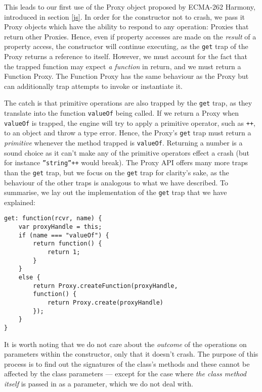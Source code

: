 This leads to our first use of the Proxy object proposed by ECMA-262 Harmony, introduced in section \ref{js}. In order for the constructor not to crash, we pass it Proxy objects which have the ability to respond to any operation: Proxies that return other Proxies. Hence, even if property accesses are made on the \emph{result} of a property access, the constructor will continue executing, as the \texttt{get} trap of the Proxy returns a reference to itself. However, we must account for the fact that the trapped function may expect \emph{a function} in return, and we must return a Function Proxy. The Function Proxy has the same behaviour as the Proxy but can additionally trap attempts to invoke or instantiate it.

The catch is that primitive operations are also trapped by the \texttt{get} trap, as they translate into the function \texttt{valueOf} being called. If we return a Proxy when \texttt{valueOf} is trapped, the engine will try to apply a primitive operator, such as \texttt{++}, to an object and throw a type error. Hence, the Proxy's \texttt{get} trap must return a \emph{primitive} whenever the method trapped is \texttt{valueOf}. Returning a number is a sound choice as it can't make any of the primitive operators effect a crash (but for instance \texttt{''string''++} would break). The Proxy API offers many more traps than the \texttt{get} trap, but we focus on the \texttt{get} trap for clarity's sake, as the behaviour of the other traps is analogous to what we have described. To summarise, we lay out the implementation of the \texttt{get} trap that we have explained:

\begin{lstlisting}
get: function(rcvr, name) {
    var proxyHandle = this;
    if (name === "valueOf") {
        return function() {
            return 1;
        }
    }
    else {
        return Proxy.createFunction(proxyHandle,
        function() {
            return Proxy.create(proxyHandle)
        });
    }
}   
\end{lstlisting}

It is worth noting that we do not care about the \emph{outcome} of the operations on parameters within the constructor, only that it doesn't crash. The purpose of this process is to find out the signatures of the class's methods and these cannot be affected by the class parameters --- except for the case where \emph{the class method itself} is passed in as a parameter, which we do not deal with.

